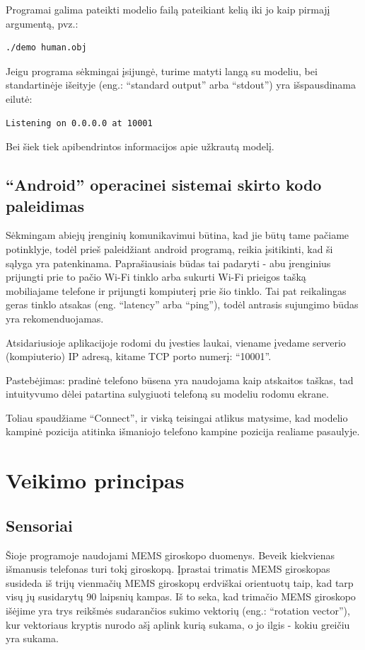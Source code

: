\documentclass[12pt, a4paper, lithuanian, final]{article}
\begin{document}
Programai galima pateikti modelio failą pateikiant kelią iki jo kaip pirmajį argumentą, pvz.:

\begin{lstlisting}[language=bash]
 ./demo human.obj
\end{lstlisting}

Jeigu programa sėkmingai įsijungė, turime matyti langą su modeliu, bei standartinėje išeityje (eng.: "`standard output"' arba "`stdout"') yra išspausdinama eilutė:
\begin{lstlisting}[language=bash]
Listening on 0.0.0.0 at 10001
\end{lstlisting}
Bei šiek tiek apibendrintos informacijos apie užkrautą modelį.


\subsection{"`Android"' operacinei sistemai skirto kodo paleidimas}

Sėkmingam abiejų įrenginių komunikavimui būtina, kad jie būtų tame pačiame potinklyje, todėl prieš paleidžiant android programą, reikia įsitikinti, kad ši sąlyga yra patenkinama.
Paprašiausiais būdas tai padaryti - abu įrenginius prijungti prie to pačio Wi-Fi tinklo arba sukurti Wi-Fi prieigos tašką mobiliajame telefone ir prijungti kompiuterį prie šio tinklo.
Tai pat reikalingas geras tinklo atsakas (eng. "`latency"' arba "`ping"'), todėl antrasis sujungimo būdas yra rekomenduojamas.

Atsidariusioje aplikacijoje rodomi du įvesties laukai, viename įvedame serverio (kompiuterio) IP adresą, kitame TCP porto numerį: "`10001"'.

Pastebėjimas: pradinė telefono būsena yra naudojama kaip atskaitos taškas, tad intuityvumo dėlei patartina sulygiuoti telefoną su modeliu rodomu ekrane.

Toliau spaudžiame "`Connect"', ir viską teisingai atlikus matysime, kad modelio kampinė pozicija atitinka išmaniojo telefono kampine pozicija realiame pasaulyje.


\section{Veikimo principas}

\subsection{Sensoriai}
Šioje programoje naudojami MEMS giroskopo duomenys.
Beveik kiekvienas išmanusis telefonas turi tokį giroskopą.
Įprastai trimatis MEMS giroskopas susideda iš trijų vienmačių MEMS giroskopų erdviškai orientuotų taip, kad tarp visų jų susidarytų 90 laipsnių kampas.
Iš to seka, kad trimačio MEMS giroskopo išėjime yra trys reikšmės sudarančios sukimo vektorių (eng.: "`rotation vector"'), kur vektoriaus kryptis nurodo ašį aplink kurią sukama, o jo ilgis - kokiu greičiu yra sukama.
\end{document}
